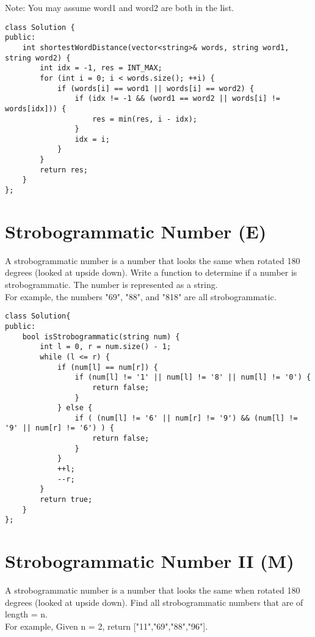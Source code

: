 Note:
You may assume word1 and word2 are both in the list. 

\begin{lstlisting}
class Solution {
public:
    int shortestWordDistance(vector<string>& words, string word1, string word2) {
        int idx = -1, res = INT_MAX;
        for (int i = 0; i < words.size(); ++i) {
            if (words[i] == word1 || words[i] == word2) {
                if (idx != -1 && (word1 == word2 || words[i] != words[idx])) {
                    res = min(res, i - idx);
                }
                idx = i;
            }
        }
        return res;
    }
};
\end{lstlisting}


\section{Strobogrammatic Number (E)}
A strobogrammatic number is a number that looks the same when rotated 180 degrees (looked at upside down). Write a function to determine if a number is strobogrammatic. The number is represented as a string.\\

For example, the numbers "69", "88", and "818" are all strobogrammatic.\\

\begin{lstlisting}
class Solution{
public:
    bool isStrobogrammatic(string num) {
        int l = 0, r = num.size() - 1;
        while (l <= r) {
            if (num[l] == num[r]) {
                if (num[l] != '1' || num[l] != '8' || num[l] != '0') {
                    return false;
                }
            } else {
                if ( (num[l] != '6' || num[r] != '9') && (num[l] != '9' || num[r] != '6') ) {
                    return false;
                }
            }
            ++l;
            --r;
        }
        return true;
    }
};
\end{lstlisting}


\section{Strobogrammatic Number II (M)}
A strobogrammatic number is a number that looks the same when rotated 180 degrees (looked at upside down). Find all strobogrammatic numbers that are of length = n.\\

For example, Given n = 2, return ["11","69","88","96"].\\

